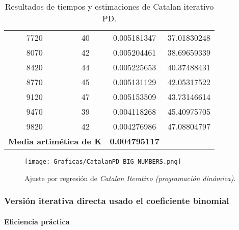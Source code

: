 \documentclass[a4paper,12pt]{article} %
\begin{document}
\begin{table}[H]
{\begin{tabular}{|c|c|c|c|}
			7720                                               & 40                   & 0.005181347              & 37.01830248                                          \\
			8070                                               & 42                   & 0.005204461              & 38.69659339                                          \\
			8420                                               & 44                   & 0.005225653              & 40.37488431                                          \\
			8770                                               & 45                   & 0.005131129              & 42.05317522                                          \\
			9120                                               & 47                   & 0.005153509              & 43.73146614                                          \\
			9470                                               & 39                   & 0.004118268              & 45.40975705                                          \\
			9820                                               & 42                   & 0.004276986              & 47.08804797                                          \\
			\hline
			\multicolumn{2}{l}{\textbf{Media artimética de K}} & \textbf{0.004795117}                                                                                   \\
			\hline
		\end{tabular}
	}
	\caption{Resultados de tiempos y estimaciones de Catalan iterativo PD.}
	\label{tab:tiempos}
\end{table}

\begin{figure}[H]
	\centering
	\texttt{[image: Graficas/CatalanPD\_BIG\_NUMBERS.png]}
	\caption{Ajuste por regresión de \textit{Catalan Iterativo (programación dinámica)}.}
\end{figure}

\subsubsection{Versión iterativa directa usado el coeficiente binomial}
\paragraph{Eficiencia práctica}
\end{document}
